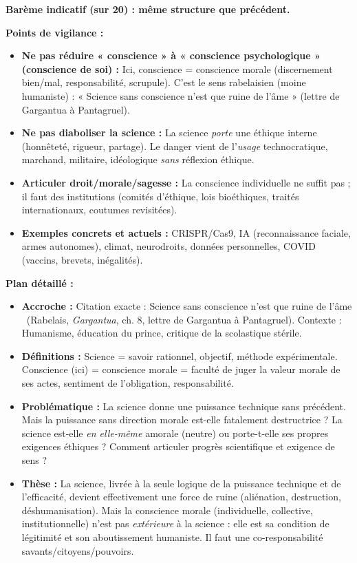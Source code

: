 \documentclass[11pt]{article}
\newcommand{\cle}[1]{{\popxbold\color{popdark}#1}}
\newcounter{popsec}
\newcounter{popsub}
\newcommand{\courssub}[1]{%
  \stepcounter{popsub}%
  \par\vspace{9pt}\noindent{\popxbold\fontsize{11.5}{13}\selectfont\color{popink}{\color{poporange}\thepopsec.\thepopsub}\hspace{6pt}#1}\par\nopagebreak\vspace{4pt}
}
\begin{document}
\begin{corrige}
\textbf{Barème indicatif (sur 20) : même structure que précédent.}

\textbf{Points de vigilance :}
\begin{itemize}
\item \textbf{Ne pas réduire « conscience » à « conscience psychologique » (conscience de soi) :} Ici, \cle{conscience} = \cle{conscience morale} (discernement bien/mal, responsabilité, scrupule). C'est le sens rabelaisien (moine humaniste) : « Science sans conscience n'est que ruine de l'âme » (lettre de Gargantua à Pantagruel).
\item \textbf{Ne pas diaboliser la science :} La science \emph{porte} une éthique interne (honnêteté, rigueur, partage). Le danger vient de l'\emph{usage} technocratique, marchand, militaire, idéologique \emph{sans} réflexion éthique.
\item \textbf{Articuler droit/morale/sagesse :} La conscience individuelle ne suffit pas ; il faut des \cle{institutions} (comités d'éthique, lois bioéthiques, traités internationaux, coutumes revisitées).
\item \textbf{Exemples concrets et actuels :} CRISPR/Cas9, IA (reconnaissance faciale, armes autonomes), climat, neurodroits, données personnelles, COVID (vaccins, brevets, inégalités).
\end{itemize}

\textbf{Plan détaillé :}

\courssub{Introduction}
\begin{itemize}
\item \textbf{Accroche :} Citation exacte : \guillemotleft Science sans conscience n'est que ruine de l'âme \guillemotright\ (Rabelais, \emph{Gargantua}, ch. 8, lettre de Gargantua à Pantagruel). Contexte : Humanisme, éducation du prince, critique de la scolastique stérile.
\item \textbf{Définitions :} Science = savoir rationnel, objectif, méthode expérimentale. Conscience (ici) = \cle{conscience morale} = faculté de juger la valeur morale de ses actes, sentiment de l'obligation, responsabilité.
\item \textbf{Problématique :} La science donne une \cle{puissance} technique sans précédent. Mais la puissance sans \cle{direction morale} est-elle fatalement destructrice ? La science est-elle \emph{en elle-même} amorale (neutre) ou porte-t-elle ses propres exigences éthiques ? Comment articuler progrès scientifique et exigence de sens ?
\item \textbf{Thèse :} La science, livrée à la seule logique de la puissance technique et de l'efficacité, devient effectivement une force de \cle{ruine} (aliénation, destruction, déshumanisation). Mais la \cle{conscience morale} (individuelle, collective, institutionnelle) n'est pas \emph{extérieure} à la science : elle est sa \cle{condition de légitimité} et son \cle{aboutissement humaniste}. Il faut une \cle{co-responsabilité} savants/citoyens/pouvoirs.
\end{itemize}


\end{corrige}
\end{document}
